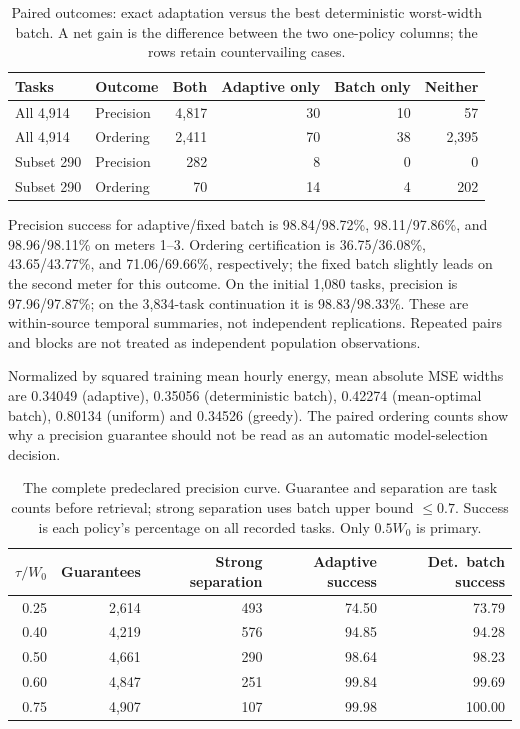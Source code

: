 \begin{table}[htbp]\centering\small
\caption{Paired outcomes: exact adaptation versus the best deterministic
worst-width batch. A net gain is the difference between the two one-policy
columns; the rows retain countervailing cases.}\label{tab:paired-outcomes}
\begin{tabular}{llrrrr}\toprule
Tasks & Outcome & Both & Adaptive only & Batch only & Neither\\\midrule
All 4,914 & Precision & 4,817 & 30 & 10 & 57\\
All 4,914 & Ordering & 2,411 & 70 & 38 & 2,395\\
Subset 290 & Precision & 282 & 8 & 0 & 0\\
Subset 290 & Ordering & 70 & 14 & 4 & 202\\
\bottomrule\end{tabular}\end{table}

Precision success for adaptive/fixed batch is 98.84/98.72\%,
98.11/97.86\%, and 98.96/98.11\% on meters 1--3. Ordering certification
is 36.75/36.08\%, 43.65/43.77\%, and 71.06/69.66\%, respectively;
the fixed batch slightly leads on the second meter for this outcome.
On the initial 1,080 tasks, precision is 97.96/97.87\%; on the 3,834-task
continuation it is 98.83/98.33\%. These are within-source temporal summaries,
not independent replications. Repeated pairs and blocks are not treated
as independent population observations.

Normalized by squared training mean hourly energy, mean absolute MSE
widths are 0.34049 (adaptive), 0.35056 (deterministic batch), 0.42274
(mean-optimal batch), 0.80134 (uniform) and 0.34526 (greedy).
The paired ordering counts show why a precision guarantee should not be
read as an automatic model-selection decision.

\begin{table}[htbp]\centering\small
\caption{The complete predeclared precision curve. Guarantee and separation
are task counts before retrieval; strong separation uses batch upper bound
$\leq0.7$. Success is each policy's percentage on all recorded tasks.
Only $0.5W_0$ is primary.}
\label{tab:counter-curve}
\begin{tabular}{rrrrr}\toprule
$\tau/W_0$ & Guarantees & Strong separation & Adaptive success & Det.\ batch success\\\midrule
0.25 & 2,614 & 493 & 74.50 & 73.79\\
0.40 & 4,219 & 576 & 94.85 & 94.28\\
0.50 & 4,661 & 290 & 98.64 & 98.23\\
0.60 & 4,847 & 251 & 99.84 & 99.69\\
0.75 & 4,907 & 107 & 99.98 & 100.00\\\bottomrule
\end{tabular}\end{table}
\FloatBarrier

